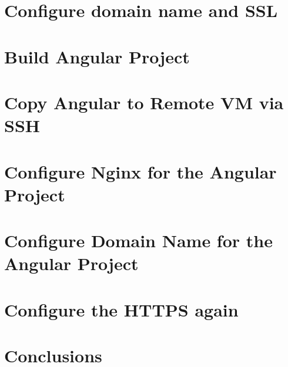 \documentclass[12pt,letterpaper,oneside,reqno]{amsart}
\numberwithin{equation}{section}
\begin{document}
    \section{Configure domain name and SSL}\label{sec:configure-domain-name-and-ssl}
    


    \section{Build Angular Project}\label{sec:build-angular-project}
    


    \section{Copy Angular to Remote VM via SSH}\label{sec:copy-angular-to-the-remote-vm-via-ssh}
    


    \section{Configure Nginx for the Angular Project}\label{sec:configure-nginx-for-the-angular-project}
    


    \section{Configure Domain Name for the Angular Project}\label{sec:configure-domain-name-for-the-angular-project}
    


    \section{Configure the HTTPS again}\label{sec:configure-the-https-again}
    


    \section{Conclusions}\label{sec:conclusions}
    

    
    
\end{document}
